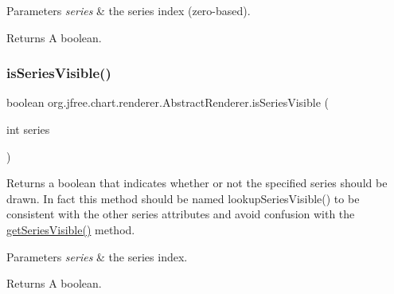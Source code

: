 \begin{DoxyParams}{Parameters}
{\em series} & the series index (zero-\/based).\\
\hline
\end{DoxyParams}
\begin{DoxyReturn}{Returns}
A boolean. 
\end{DoxyReturn}
\mbox{\label{classorg_1_1jfree_1_1chart_1_1renderer_1_1_abstract_renderer_aa972c5c461d3124942180db93f33ac35}} 
\subsubsection{\texorpdfstring{is\+Series\+Visible()}{isSeriesVisible()}}
{\footnotesize\ttfamily boolean org.\+jfree.\+chart.\+renderer.\+Abstract\+Renderer.\+is\+Series\+Visible (\begin{DoxyParamCaption}\item[{int}]{series }\end{DoxyParamCaption})}

Returns a boolean that indicates whether or not the specified series should be drawn. In fact this method should be named lookup\+Series\+Visible() to be consistent with the other series attributes and avoid confusion with the \mbox{\hyperlink{classorg_1_1jfree_1_1chart_1_1renderer_1_1_abstract_renderer_a2779761677dd1fc3387fde96068b0b85}{get\+Series\+Visible()}} method.


\begin{DoxyParams}{Parameters}
{\em series} & the series index.\\
\hline
\end{DoxyParams}
\begin{DoxyReturn}{Returns}
A boolean. 
\end{DoxyReturn}
\mbox{\label{classorg_1_1jfree_1_1chart_1_1renderer_1_1_abstract_renderer_acdf46f032810ca5b9c467ab47a8ad087}} 
